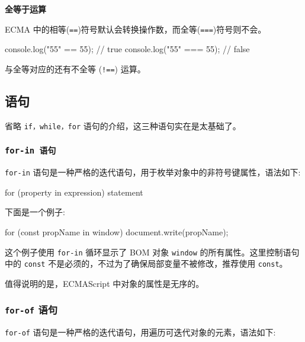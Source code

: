 \noindent\textbf{全等于运算}

ECMA 中的相等(\texttt{==})符号默认会转换操作数，而全等(\texttt{===})符号则不会。

\begin{JavaScript}
console.log("55" == 55);    // true
console.log("55" === 55);   // false
\end{JavaScript}

与全等对应的还有不全等 (\texttt{!==}) 运算。


\subsection{语句}

省略 \texttt{if，while，for} 语句的介绍，这三种语句实在是太基础了。

\subsubsection{\texttt{\texttt{for-in} 语句}}

\texttt{for-in} 语句是一种严格的迭代语句，用于枚举对象中的非符号键属性，语法如下:

\begin{JavaScript}
for (property in expression) statement
\end{JavaScript}

下面是一个例子:

\begin{JavaScript}
for (const propName in window) {
    document.write(propName);
}
\end{JavaScript}

这个例子使用 \texttt{for-in} 循环显示了 BOM 对象 \texttt{window} 的所有属性。这里控制语句中的 \texttt{const} 不是必须的，不过为了确保局部变量不被修改，推荐使用 \texttt{const}。

值得说明的是，ECMAScript 中对象的属性是无序的。

\subsubsection{\texttt{for-of} 语句}

\texttt{for-of} 语句是一种严格的迭代语句，用遍历可迭代对象的元素，语法如下:


